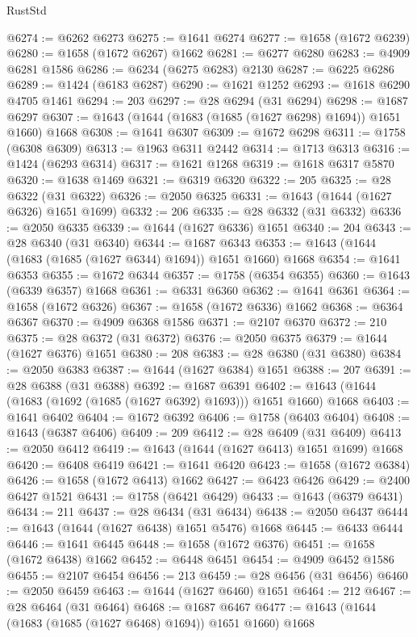 \begin{lexlean}{RustStd}
\begin{coremodule}
@6274 := @6262 @6273
@6275 := @1641 @6274
@6277 := @1658 (@1672 @6239)
@6280 := @1658 (@1672 @6267) @1662
@6281 := @6277 @6280
@6283 := @4909 @6281 @1586
@6286 := @6234 (@6275 @6283) @2130
@6287 := @6225 @6286
@6289 := @1424 (@6183 @6287)
@6290 := @1621 @1252
@6293 := @1618 @6290 @4705 @1461
@6294 := 203
@6297 := @28 @6294 (@31 @6294)
@6298 := @1687 @6297
@6307 := @1643 (@1644 (@1683 (@1685 (@1627 @6298) @1694)) @1651 @1660) @1668
@6308 := @1641 @6307
@6309 := @1672 @6298
@6311 := @1758 (@6308 @6309)
@6313 := @1963 @6311 @2442
@6314 := @1713 @6313
@6316 := @1424 (@6293 @6314)
@6317 := @1621 @1268
@6319 := @1618 @6317 @5870
@6320 := @1638 @1469
@6321 := @6319 @6320
@6322 := 205
@6325 := @28 @6322 (@31 @6322)
@6326 := @2050 @6325
@6331 := @1643 (@1644 (@1627 @6326) @1651 @1699)
@6332 := 206
@6335 := @28 @6332 (@31 @6332)
@6336 := @2050 @6335
@6339 := @1644 (@1627 @6336) @1651
@6340 := 204
@6343 := @28 @6340 (@31 @6340)
@6344 := @1687 @6343
@6353 := @1643 (@1644 (@1683 (@1685 (@1627 @6344) @1694)) @1651 @1660) @1668
@6354 := @1641 @6353
@6355 := @1672 @6344
@6357 := @1758 (@6354 @6355)
@6360 := @1643 (@6339 @6357) @1668
@6361 := @6331 @6360
@6362 := @1641 @6361
@6364 := @1658 (@1672 @6326)
@6367 := @1658 (@1672 @6336) @1662
@6368 := @6364 @6367
@6370 := @4909 @6368 @1586
@6371 := @2107 @6370
@6372 := 210
@6375 := @28 @6372 (@31 @6372)
@6376 := @2050 @6375
@6379 := @1644 (@1627 @6376) @1651
@6380 := 208
@6383 := @28 @6380 (@31 @6380)
@6384 := @2050 @6383
@6387 := @1644 (@1627 @6384) @1651
@6388 := 207
@6391 := @28 @6388 (@31 @6388)
@6392 := @1687 @6391
@6402 := @1643 (@1644 (@1683 (@1692 (@1685 (@1627 @6392) @1693))) @1651 @1660) @1668
@6403 := @1641 @6402
@6404 := @1672 @6392
@6406 := @1758 (@6403 @6404)
@6408 := @1643 (@6387 @6406)
@6409 := 209
@6412 := @28 @6409 (@31 @6409)
@6413 := @2050 @6412
@6419 := @1643 (@1644 (@1627 @6413) @1651 @1699) @1668
@6420 := @6408 @6419
@6421 := @1641 @6420
@6423 := @1658 (@1672 @6384)
@6426 := @1658 (@1672 @6413) @1662
@6427 := @6423 @6426
@6429 := @2400 @6427 @1521
@6431 := @1758 (@6421 @6429)
@6433 := @1643 (@6379 @6431)
@6434 := 211
@6437 := @28 @6434 (@31 @6434)
@6438 := @2050 @6437
@6444 := @1643 (@1644 (@1627 @6438) @1651 @5476) @1668
@6445 := @6433 @6444
@6446 := @1641 @6445
@6448 := @1658 (@1672 @6376)
@6451 := @1658 (@1672 @6438) @1662
@6452 := @6448 @6451
@6454 := @4909 @6452 @1586
@6455 := @2107 @6454
@6456 := 213
@6459 := @28 @6456 (@31 @6456)
@6460 := @2050 @6459
@6463 := @1644 (@1627 @6460) @1651
@6464 := 212
@6467 := @28 @6464 (@31 @6464)
@6468 := @1687 @6467
@6477 := @1643 (@1644 (@1683 (@1685 (@1627 @6468) @1694)) @1651 @1660) @1668

\end{coremodule}
\end{lexlean}
